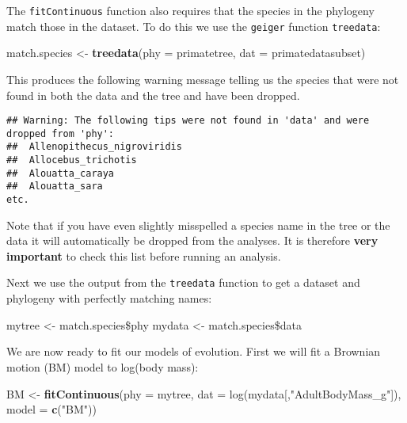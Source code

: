 \documentclass[11pt]{article}
\newcommand{\KeywordTok}[1]{\textcolor[rgb]{0.13,0.29,0.53}{\textbf{{#1}}}}
\newcommand{\DataTypeTok}[1]{\textcolor[rgb]{0.13,0.29,0.53}{{#1}}}
\newcommand{\CharTok}[1]{\textcolor[rgb]{0.31,0.60,0.02}{{#1}}}
\newcommand{\StringTok}[1]{\textcolor[rgb]{0.31,0.60,0.02}{{#1}}}
\newcommand{\NormalTok}[1]{{#1}}
\begin{document}
The \texttt{fitContinuous} function also requires that the species in the phylogeny match those in the dataset. To do this we use the \texttt{geiger} function \texttt{treedata}:

\begin{snugshade}
\begin{Highlighting}[]
\NormalTok{match.species <-}\StringTok{ }\KeywordTok{treedata}\NormalTok{(}\DataTypeTok{phy = }\NormalTok{primatetree,} \DataTypeTok{dat = }\NormalTok{primatedatasubset)}
\end{Highlighting}
\end{snugshade}

This produces the following warning message telling us the species that were not found in both the data and the tree and have been dropped.
\begin{verbatim}
## Warning: The following tips were not found in 'data' and were dropped from 'phy':
##  Allenopithecus_nigroviridis
##  Allocebus_trichotis
##  Alouatta_caraya
##  Alouatta_sara
etc.
\end{verbatim}

\begin{framed}
Note that if you have even slightly misspelled a species name in the tree or the data it will automatically be dropped from the analyses. It is therefore \textbf{very important} to check this list before running an analysis.
\end{framed}

Next we use the output from the \texttt{treedata} function to get a dataset and phylogeny with perfectly matching names:

\begin{snugshade}
\begin{Highlighting}[]
\NormalTok{mytree <-}\StringTok{ }\NormalTok{match.species\$phy}
\NormalTok{mydata <-}\StringTok{ }\NormalTok{match.species\$data}
\end{Highlighting}
\end{snugshade}

We are now ready to fit our models of evolution. First we will fit a Brownian motion (BM) model to log(body mass):

\begin{snugshade}
\begin{Highlighting}[]
\NormalTok{BM <-}\StringTok{ }\KeywordTok{fitContinuous}\NormalTok{(\DataTypeTok{phy = }mytree, \DataTypeTok{dat = }log(mydata[,"AdultBodyMass_g"]),} 
                    \DataTypeTok{model = }\KeywordTok{c}\NormalTok{(}\StringTok{"}\CharTok{BM}\StringTok{"}\NormalTok{))}
\end{Highlighting}
\end{snugshade}
\end{document}
